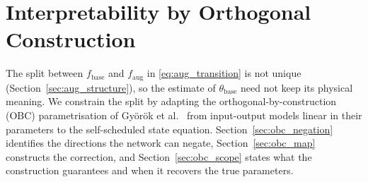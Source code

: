 \section{Interpretability by Orthogonal Construction}\label{sec:obc}

The split between $f_{\mathrm{base}}$ and $f_{\mathrm{aug}}$ in
\eqref{eq:aug_transition} is not unique (Section~\ref{sec:aug_structure}), so
the estimate of $\theta_{\mathrm{base}}$ need not keep its physical meaning.
We constrain the split by adapting the orthogonal-by-construction (OBC)
parametrisation of Gy\"or\"ok et al.~\cite{gyorok2026obc} from input-output
models linear in their parameters to the self-scheduled state equation.
Section~\ref{sec:obc_negation} identifies the directions the network can
negate, Section~\ref{sec:obc_map} constructs the correction, and
Section~\ref{sec:obc_scope} states what the construction guarantees and when
it recovers the true parameters.

